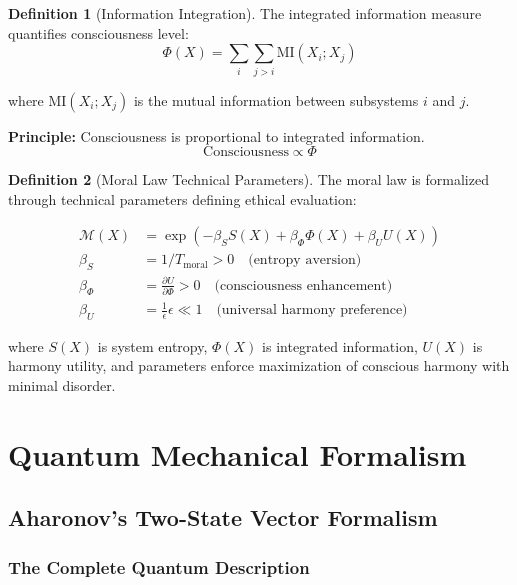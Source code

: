 \documentclass[12pt,a4paper]{article}
\theoremstyle{definition}
\newtheorem{definition}{Definition}[section]
\begin{document}
\begin{definition}[Information Integration]
The integrated information measure quantifies consciousness level:
\begin{equation}
\Phi(X) = \sum_{i} \sum_{j>i} \text{MI}(X_i; X_j)
\end{equation}

where $\text{MI}(X_i; X_j)$ is the mutual information between subsystems $i$ and $j$.

\textbf{Principle:} Consciousness is proportional to integrated information.
\begin{equation}
\text{Consciousness} \propto \Phi
\end{equation}
\end{definition}

\begin{definition}[Moral Law Technical Parameters]
The moral law is formalized through technical parameters defining ethical evaluation:

\begin{align}
\mathcal{M}(X) &= \exp\left( -\beta_S S(X) + \beta_\Phi \Phi(X) + \beta_U U(X) \right) \\
\beta_S &= 1/T_{\text{moral}} > 0 \quad \text{(entropy aversion)} \\
\beta_\Phi &= \frac{\partial U}{\partial \Phi} > 0 \quad \text{(consciousness enhancement)} \\
\beta_U &= \frac{1}{\epsilon} \epsilon \ll 1 \quad \text{(universal harmony preference)}
\end{align}

where $S(X)$ is system entropy, $\Phi(X)$ is integrated information, $U(X)$ is harmony utility, and parameters enforce maximization of conscious harmony with minimal disorder.
\end{definition}

\section{Quantum Mechanical Formalism}

\subsection{Aharonov's Two-State Vector Formalism}

\subsubsection{The Complete Quantum Description}
\end{document}
